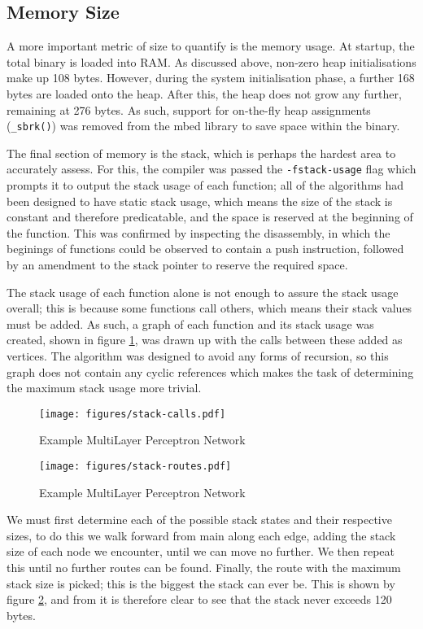 \subsection{Memory Size}

A more important metric of size to quantify is the memory usage. At startup, the total binary is loaded into RAM. As discussed above, non-zero heap initialisations make up 108 bytes. However, during the system initialisation phase, a further 168 bytes are loaded onto the heap. After this, the heap does not grow any further, remaining at 276 bytes. As such, support for on-the-fly heap assignments (\verb|_sbrk()|) was removed from the mbed library to save space within the binary.

The final section of memory is the stack, which is perhaps the hardest area to accurately assess. For this, the compiler was passed the \verb|-fstack-usage| flag which prompts it to output the stack usage of each function; all of the algorithms had been designed to have static stack usage, which means the size of the stack is constant and therefore predicatable, and the space is reserved at the beginning of the function. This was confirmed by inspecting the disassembly, in which the beginings of functions could be observed to contain a push instruction, followed by an amendment to the stack pointer to reserve the required space.

The stack usage of each function alone is not enough to assure the stack usage overall; this is because some functions call others, which means their stack values must be added. As such, a graph of each function and its stack usage was created, shown in figure \ref{fig:stack-calls}, was drawn up with the calls between these added as vertices. The algorithm was designed to avoid any forms of recursion, so this graph does not contain any cyclic references which makes the task of determining the maximum stack usage more trivial.

\begin{figure}[!h]
    \centering
    \texttt{[image: figures/stack-calls.pdf]}
    \caption{Example MultiLayer Perceptron Network}
    \label{fig:stack-calls}
\end{figure}

\begin{figure}[!h]
    \centering
    \texttt{[image: figures/stack-routes.pdf]}
    \caption{Example MultiLayer Perceptron Network}
    \label{fig:stack-routes}
\end{figure}

We must first determine each of the possible stack states and their respective sizes, to do this we walk forward from main along each edge, adding the stack size of each node we encounter, until we can move no further. We then repeat this until no further routes can be found. Finally, the route with the maximum stack size is picked; this is the biggest the stack can ever be. This is shown by figure \ref{fig:stack-routes}, and from it is therefore clear to see that the stack never exceeds 120 bytes.

